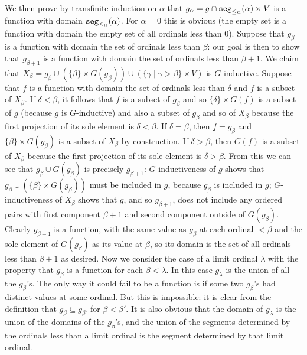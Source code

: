 \documentclass[12pt]{book}
\begin{document}
\begin{description}
We then prove by transfinite induction on $\alpha$ that $g_{\alpha} =
g \cap {\tt seg}_{\leq_{\Omega}}(\alpha)\times V$ is a function with
domain ${\tt seg}_{\leq_{\Omega}}(\alpha)$.  For $\alpha=0$ this is
obvious (the empty set is a function with domain the empty set of all
ordinals less than 0).  Suppose that $g_{\beta}$ is a function with
domain the set of ordinals less than $\beta$: our goal is then to show
that $g_{\beta+1}$ is a function with domain the set of ordinals less
than $\beta+1$.  We claim that $X_{\beta}= g_{\beta} \cup (\{\beta\}
\times G(g_{\beta})) \cup (\{\gamma \mid \gamma > \beta\} \times V)$
is $G$-inductive.  Suppose that $f$ is a function with domain the set
of ordinals less than $\delta$ and $f$ is a subset of $X_{\beta}$.  If
$\delta<\beta$, it follows that $f$ is a subset of $g_{\beta}$ and so
$\{\delta\} \times G(f)$ is a subset of $g$ (because $g$ is
$G$-inductive) and also a subset of $g_{\beta}$ and so of $X_{\beta}$
because the first projection of its sole element is $\delta < \beta$.
If $\delta=\beta$, then $f=g_{\beta}$ and $\{\beta\}\times
G(g_{\beta})$ is a subset of $X_{\beta}$ by construction.  If
$\delta>\beta$, then $G(f)$ is a subset of $X_{\beta}$ because the
first projection of its sole element is $\delta>\beta$.  From this we
can see that $g_{\beta} \cup G(g_{\beta})$ is precisely $g_{\beta+1}$:
$G$-inductiveness of $g$ shows that $g_{\beta} \cup (\{\beta\}\times
G(g_{\beta}))$ must be included in $g$, because $g_{\beta}$ is
included in $g$; $G$-inductiveness of $X_{\beta}$ shows that $g$, and
so $g_{\beta+1}$, does not include any ordered pairs with first
component $\beta+1$ and second component outside of $G(g_{\beta})$.
Clearly $g_{\beta+1}$ is a function, with the same value as
$g_{\beta}$ at each ordinal $< \beta$ and the sole element of
$G(g_{\beta})$ as its value at $\beta$, so its domain is the set of
all ordinals less than $\beta+1$ as desired.  Now we consider the case
of a limit ordinal $\lambda$ with the property that $g_{\beta}$ is a
function for each $\beta<\lambda$.  In this case $g_{\lambda}$ is the
union of all the $g_{\beta}$'s.  The only way it could fail to be a
function is if some two $g_{\beta}$'s had distinct values at some
ordinal.  But this is impossible: it is clear from the definition that
$g_{\beta} \subseteq g_{\beta'}$ for $\beta<\beta'$.  It is also
obvious that the domain of $g_{\lambda}$ is the union of the domains
of the $g_{\beta}$'s, and the union of the segments determined by the
ordinals less than a limit ordinal is the segment determined by that
limit ordinal.


\end{description}
\end{document}
